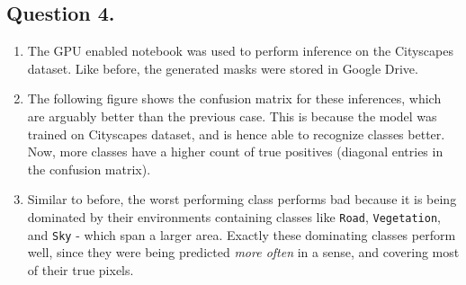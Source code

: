 \documentclass[10pt]{article}
\begin{document}
    \subsection*{\textbf{Question 4.}}
    \begin{enumerate}[label=(\alph*)]
        \item The GPU enabled notebook was used to perform inference on the Cityscapes dataset. Like before,
        the generated masks were stored in Google Drive.
        \item The following figure shows the confusion matrix for these inferences, which are arguably better
        than the previous case. This is because the model was trained on Cityscapes dataset, and is hence able
        to recognize classes better. Now, more classes have a higher count of true positives (diagonal entries
        in the confusion matrix).
        \item Similar to before, the worst performing class performs bad because it is being dominated by
        their environments containing classes like \texttt{Road}, \texttt{Vegetation}, and \texttt{Sky} -
        which span a larger area. Exactly these dominating classes perform well, since they were being predicted
        \textit{more often} in a sense, and covering most of their true pixels.
    \end{enumerate}
\end{document}
